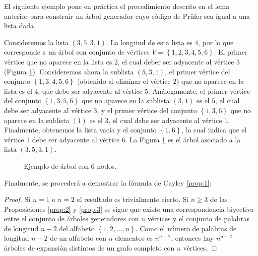 El siguiente ejemplo pone en práctica el procedimiento descrito en el lema anterior para construir un árbol generador cuyo código de Prüfer sea igual a una lista dada.

\begin{exampleth}
Consideremos la lista $(3,5,3,1)$. La longitud de esta lista es $4$, por lo que corresponde a un árbol con conjunto de vértices $V = \left\lbrace 1,2,3,4,5,6 \right\rbrace$. El primer vértice que no aparece en la lista es $2$, el cual deber ser adyacente al vértice $3$ (Figura \ref{fig:arbol2}). Consideremos ahora la sublista $(5,3,1)$, el primer vértice del conjunto $\left\lbrace 1,3,4,5,6 \right\rbrace$ (obtenido al eliminar el vértice $2$) que no aparece en la lista es el $4$, que debe ser adyacente al vértice $5$. Análogamente, el primer vértice del conjunto $\left\lbrace 1,3,5,6 \right\rbrace$ que no aparece en la sublista $(3,1)$ es el $5$, el cual debe ser adyacente al vértice $3$, y el primer vértice del conjunto $\left\lbrace 1,3,6 \right\rbrace$ que no aparece en la sublista $(1)$ es el $3$, el cual debe ser adyacente al vértice $1$. Finalmente, obtenemos la lista vacía y el conjunto $\left\lbrace 1,6 \right\rbrace$, lo cual indica que el vértice $1$ debe ser adyacente al vértice $6$. La Figura \ref{fig:arbol2} es el árbol asociado a la lista $(3,5,3,1)$.
\end{exampleth}

\begin{figure}[H]
\centering
{}
\caption{Ejemplo de árbol con $6$ nodos.}
\label{fig:arbol2}
\end{figure}

Finalmente, se procederá a demostrar la fórmula de Cayley \ref{prop:1}:
\begin{proof}
Si $n = 1$ o $n = 2$ el resultado es trivialmente cierto. Si $n \geq 3$ de las Proposiciones \ref{prop:2} y \ref{prop:3} se sigue que existe una correspondencia biyectiva entre el conjunto de árboles generadores con $n$ vértices y el conjunto de palabras de longitud $n-2$ del alfabeto $\left\lbrace 1,2,\dots,n \right\rbrace$. Como el número de palabras de longitud $n-2$ de un alfabeto con $n$ elementos es $n^{n-2}$, entonces hay $n^{n-2}$ árboles de expansión distintos de un grafo completo con $n$ vértices.
\end{proof}

